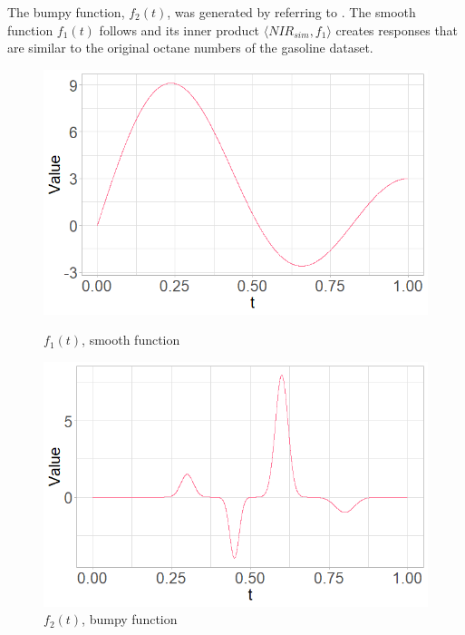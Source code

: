 \documentclass[11pt,twoside,a4paper]{article}
\begin{document}
    The bumpy function, $f_2(t)$, was generated by referring to \cite{cardot_bumpyfunction_2002}. The smooth function $f_1(t)$ follows \cite{Reiss_2007b} and its inner product $\langle NIR_{sim}, f_1 \rangle$ creates responses that are similar to the original octane numbers of the gasoline dataset. 

		\vspace{0.1cm}
		\begin{figure}
			\centering
			\begin{minipage}{.5\textwidth}
				\centering
  				\includegraphics[width=\textwidth]{../Graphics/smooth_function.png}
  				\caption{$f_1(t)$, smooth function}
  				\label{fig:test1}
			\end{minipage}%
			\begin{minipage}{.5\textwidth}
	  			\centering
  				\includegraphics[width=\textwidth]{../Graphics/bumpy_function.png}
  				\caption{$f_2(t)$, bumpy function}
  				\label{fig:test2}
			\end{minipage}
		\end{figure}
		
\end{document}
